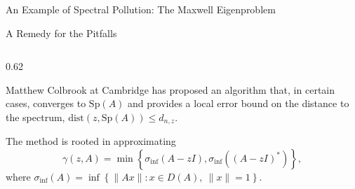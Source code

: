 \documentclass[aspectratio=169]{beamer}
\begin{document}
\begin{frame}{An Example of Spectral Pollution: The Maxwell Eigenproblem}
\end{frame}


\begin{frame}{A Remedy for the Pitfalls}

    \begin{columns}[T]

    \begin{column}{0.62\textwidth}

    Matthew Colbrook at Cambridge has proposed an algorithm that, in certain cases, converges to $\text{Sp}(A)$ and provides a local error bound on the distance to the spectrum, $ \text{dist}(z, \text{Sp}(A)) \le d_{n,z}.$ 

    \vspace{1em}

    The method is rooted in approximating
    $$  \gamma(z,A)=\min\left\{
\sigma_{\inf}(A-zI),
\sigma_{\inf}\left((A-zI)^*\right)
\right\},$$
where $\sigma_{\inf}(A) = 
\inf\left\{
\|Ax\| : x \in D(A),\ \|x\|=1
\right\}.$


\end{column}
\end{columns}
\end{frame}
\end{document}
